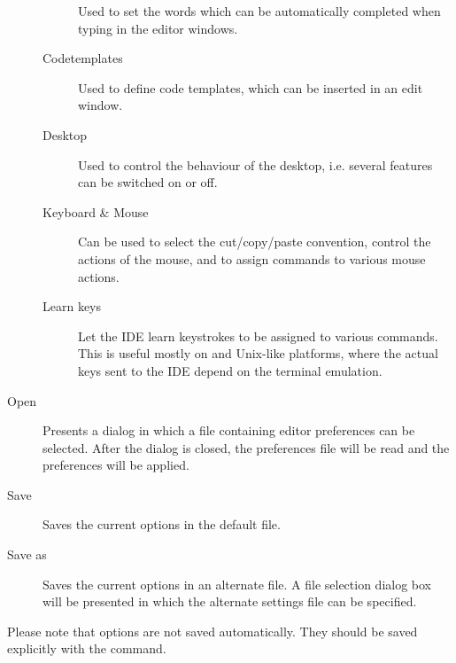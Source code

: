 \begin{description}
\begin{description}
Used to set the words which can be automatically completed when typing in
the editor windows.
\item[Codetemplates]
Used to define code templates, which can be inserted in an edit window.
\item[Desktop]
Used to control the behaviour of the desktop, i.e. several features can be
switched on or off.
\item[Keyboard \& Mouse] Can be used to select the cut/copy/paste
convention, control the actions of the mouse, and to assign commands 
to various mouse actions.
\item[Learn keys] Let the IDE learn keystrokes to be assigned to various 
commands. This is useful mostly on \linux and Unix-like platforms, where the
actual keys sent to the IDE depend on the terminal emulation.
\end{description}
\item[Open]
Presents a dialog in which a file containing editor preferences can be selected.
After the dialog is closed, the preferences file will be read and the
preferences will be applied.
\item[Save]
Saves the current options in the default file.
\item[Save as]
Saves the current options in an alternate file. A file selection dialog box
will be presented in which the alternate settings file can be specified.
\end{description}
Please note that options are not saved automatically. They should be saved
explicitly with the  command.
%
%
